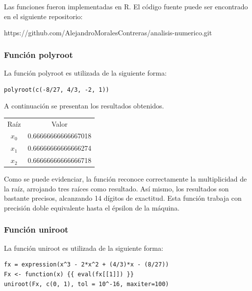 \documentclass[a4paper,12pt]{article}
\begin{document}
Las funciones fueron implementadas en R. El código fuente puede ser encontrado en el siguiente repositorio: \par

\vspace{1em}
https://github.com/AlejandroMoralesContreras/analisis-numerico.git \par

\subsubsection{Función polyroot}

La función polyroot es utilizada de la siguiente forma: \par

\begin{verbatim}
polyroot(c(-8/27, 4/3, -2, 1))
\end{verbatim}

A continuación se presentan los resultados obtenidos. \par

\begin{table}[ht!]
\begin{tabular}{cr}
Raíz & \multicolumn{1}{c}{Valor}  \\
$x_0$ & 0.66666666666667018       \\
$x_1$ & 0.66666666666666274       \\
$x_2$ & 0.66666666666666718      
\end{tabular}
\end{table}

Como se puede evidenciar, la función reconoce correctamente la multiplicidad de la raíz, arrojando tres raíces como resultado. Así mismo, los resultados son bastante precisos, alcanzando 14 dígitos de exactitud. Esta función trabaja con precisión doble equivalente hasta el épsilon de la máquina. \par

\subsubsection{Función uniroot}

La función uniroot es utilizada de la siguiente forma: \par

\begin{verbatim}
fx = expression(x^3 - 2*x^2 + (4/3)*x - (8/27))
Fx <- function(x) {{ eval(fx[[1]]) }}
uniroot(Fx, c(0, 1), tol = 10^-16, maxiter=100)
\end{verbatim}
\end{document}
